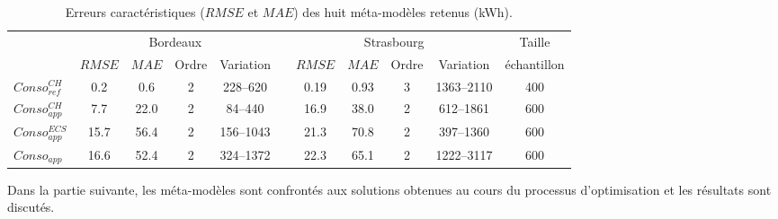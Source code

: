 \begin{table}
\centering
\caption[Erreurs caractéristiques des huit méta-modèles retenus]
        {Erreurs caractéristiques ($RMSE$ et $MAE$) des huit méta-modèles retenus (\si{kWh}).}
\label{tab:meta_result_bilan}
\begin{tabular}{l c c c c c c c c c c}
    \toprule
                    & \multicolumn{4}{c}{Bordeaux} & & \multicolumn{4}{c}{Strasbourg} &
                      Taille \\
                    \cmidrule(r){2-5}
                    \cmidrule(r){7-10}
                    & $RMSE$ & $MAE$  & Ordre & Variation  &       & $RMSE$ & $MAE$ & Ordre & Variation & échantillon \\
    \midrule
    $Conso_{ref}^{CH}$  & \num{0.2}  & \num{0.6}  & \num{2} & \numrange{228}{620}&   & \num{0.19}   & \num{0.93}  & \num{3}     & \numrange{1363}{2110}      & \num{400}  \\
    \addlinespace[\defaultaddspace]
    $Conso_{app}^{CH}$  & \num{7.7}  & \num{22.0} & \num{2} & \numrange{84}{440} &   & \num{16.9}   & \num{38.0}  & \num{2}     & \numrange{612}{1861}       & \num{600} \\
    \addlinespace[\defaultaddspace]
    $Conso_{app}^{ECS}$ & \num{15.7} & \num{56.4} & \num{2} & \numrange{156}{1043}&  & \num{21.3}   & \num{70.8}  & \num{2}     & \numrange{397}{1360}       & \num{600} \\
    \addlinespace[\defaultaddspace]
    $Conso_{app}$       & \num{16.6} & \num{52.4} & \num{2} & \numrange{324}{1372}&  & \num{22.3}   & \num{65.1}  & \num{2}     & \numrange{1222}{3117}       & \num{600} \\
    \bottomrule
\end{tabular}
\end{table}

Dans la partie suivante, les méta-modèles sont confrontés aux solutions obtenues
au cours du processus d’optimisation et les résultats sont discutés.



